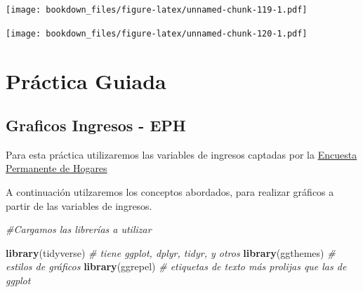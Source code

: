 \documentclass[]{book}
\newenvironment{Shaded}{\begin{snugshade}}{\end{snugshade}}
\newcommand{\CommentTok}[1]{\textcolor[rgb]{0.56,0.35,0.01}{\textit{#1}}}
\newcommand{\DataTypeTok}[1]{\textcolor[rgb]{0.13,0.29,0.53}{#1}}
\newcommand{\DecValTok}[1]{\textcolor[rgb]{0.00,0.00,0.81}{#1}}
\newcommand{\KeywordTok}[1]{\textcolor[rgb]{0.13,0.29,0.53}{\textbf{#1}}}
\newcommand{\NormalTok}[1]{#1}
\newcommand{\OperatorTok}[1]{\textcolor[rgb]{0.81,0.36,0.00}{\textbf{#1}}}
\newcommand{\StringTok}[1]{\textcolor[rgb]{0.31,0.60,0.02}{#1}}
\begin{document}
\texttt{[image: bookdown\_files/figure-latex/unnamed-chunk-119-1.pdf]}

\begin{Shaded}
\end{Shaded}

\texttt{[image: bookdown\_files/figure-latex/unnamed-chunk-120-1.pdf]}

\hypertarget{practica-guiada-3}{%
\section{Práctica Guiada}\label{practica-guiada-3}}

\hypertarget{graficos-ingresos---eph}{%
\subsection{Graficos Ingresos - EPH}\label{graficos-ingresos---eph}}

Para esta práctica utilizaremos las variables de ingresos captadas por la \href{https://www.indec.gob.ar/indec/web/Institucional-Indec-BasesDeDatos}{Encuesta Permanente de Hogares}

A continuación utilzaremos los conceptos abordados, para realizar gráficos a partir de las variables de ingresos.

\begin{Shaded}
\begin{Highlighting}[]
\CommentTok{#Cargamos las librerías a utilizar}

\KeywordTok{library}\NormalTok{(tidyverse) }\CommentTok{# tiene ggplot, dplyr, tidyr, y otros}
\KeywordTok{library}\NormalTok{(ggthemes)  }\CommentTok{# estilos de gráficos}
\KeywordTok{library}\NormalTok{(ggrepel)   }\CommentTok{# etiquetas de texto más prolijas que las de ggplot}
\end{Highlighting}
\end{Shaded}
\end{document}
